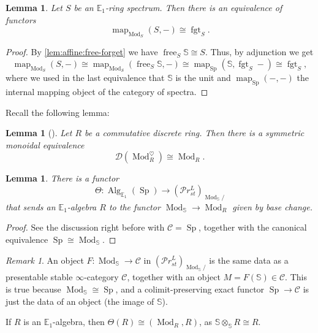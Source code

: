 \documentclass{article}
\theoremstyle{definition}
\theoremstyle{definition}
\theoremstyle{definition}
\theoremstyle{plain}
\newtheorem{lem}[defn]{Lemma}
\theoremstyle{plain}
\theoremstyle{plain}
\theoremstyle{plain}
\theoremstyle{plain}
\theoremstyle{plain}
\theoremstyle{plain}
\theoremstyle{plain}
\theoremstyle{remark}
\newtheorem{rmk}[defn]{Remark}
\theoremstyle{remark}
\theoremstyle{plain}
\theoremstyle{plain}
\theoremstyle{plain}
\theoremstyle{plain}
\theoremstyle{plain}
\newcommand{\Alg}[1]{\operatorname{Alg}_{#1}}
\newcommand{\Mod}[1]{\operatorname{Mod}_{#1}}
\newcommand{\ModDisc}[1]{\operatorname{Mod}_{#1}^{\heartsuit}}
\newcommand{\Sp}{\operatorname{Sp}}
\renewcommand{\S}{\mathbb{S}}
\newcommand{\fgt}[1]{\operatorname{fgt}_{#1}}
\newcommand{\free}[1]{\operatorname{free}_{#1}}
\newcommand{\Cat}[1]{\mathcal{#1}}
\newcommand{\map}[3]{\operatorname{map}_{#1}({#2}, {#3})} %
\newcommand{\PrSt}{\mathcal{P}r^{L}_{st}}
\begin{document}
\begin{lem} \label{lem:affine:maps-from-unit}
    Let $S$ be an $\mathbb{E}_1$-ring spectrum.
    Then there is an equivalence of functors
    \begin{equation*}
        \map{\Mod{S}}{S}{-} \cong \fgt{S}.
    \end{equation*}
\end{lem}
\begin{proof}
    By \cref{lem:affine:free-forget} we have $\free{S} \S \cong S$.
    Thus, by adjunction we get
    \begin{equation*}
        \map{\Mod{S}}{S}{-} \cong \map{\Mod{S}}{\free{S} \S}{-} \cong \map{\Sp}{\S}{\fgt{S} -} \cong \fgt{S},
    \end{equation*}
    where we used in the last equivalence that $\S$ is the unit and $\map{\Sp}{-}{-}$ the internal mapping object
    of the category of spectra.
\end{proof}

Recall the following lemma:
\begin{lem} [{\cite[Theorem 7.1.2.13]{higheralgebra}}] \label{lem:affine:derived-cat-of-modules}
    Let $R$ be a commutative discrete ring.
    Then there is a symmetric monoidal equivalence
    \begin{equation*}
        \Cat{D}(\ModDisc{R}) \cong \Mod{R}.
    \end{equation*}
\end{lem}

\begin{lem}
    There is a functor
    \begin{equation*}
        \Theta \colon \Alg{\mathbb{E}_1}(\Sp) \to {(\PrSt)}_{\Mod{\S}/}
    \end{equation*}
    that sends an $\mathbb{E}_1$-algebra $R$ to the functor $\Mod{\S} \to \Mod{R}$ given by base change.
\end{lem}
\begin{proof}
    See the discussion right before \cite[Corollary 4.8.5.13]{higheralgebra} with $\Cat C = \Sp$,
    together with the canonical equivalence $\Sp \cong \Mod{\S}$.
\end{proof}

\begin{rmk}
    An object $F \colon \Mod{\S} \to \Cat C$ in ${(\PrSt)}_{\Mod{\S}/}$
    is the same data as a presentable stable $\infty$-category $\Cat C$, together with an object $M = F(\S) \in \Cat C$.
    This is true because $\Mod{\S} \cong \Sp$, and a colimit-preserving exact functor $\Sp \to \Cat C$
    is just the data of an object (the image of $\S$).

    If $R$ is an $\mathbb{E}_1$-algebra, then $\Theta(R) \cong (\Mod{R}, R)$,
    as $\S \otimes_{\S} R \cong R$.
\end{rmk}
\end{document}
